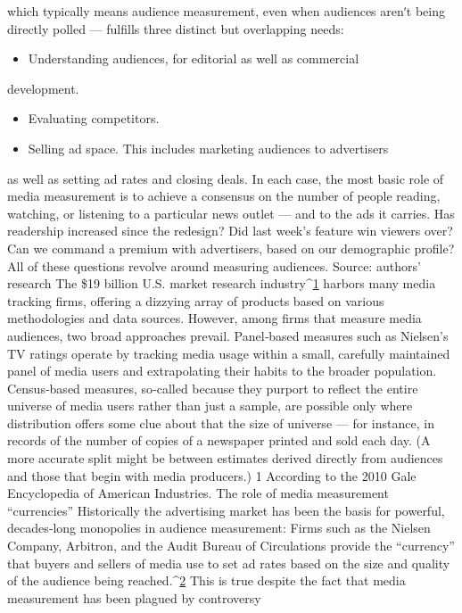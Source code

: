 which typically means audience measurement, even when audiences
arenʹt being directly polled — fulfills three distinct but overlapping needs:
\begin{itemize}
\item Understanding audiences, for editorial as well as commercial
\end{itemize}
development.
\begin{itemize}
\item Evaluating competitors.
\item Selling ad space. This includes marketing audiences to advertisers
\end{itemize}
as well as setting ad rates and closing deals.
In each case, the most basic role of media measurement is to achieve a
consensus on the number of people reading, watching, or listening to a
particular news outlet — and to the ads it carries. Has readership
increased since the redesign? Did last week’s feature win viewers over?
Can we command a premium with advertisers, based on our demographic
profile? All of these questions revolve around measuring audiences.
Source: authors’ research
The \$19 billion U.S. market research industry^{\href{#endnotes}{1}} harbors many media
tracking firms, offering a dizzying array of products based on various
methodologies and data sources. However, among firms that measure
media audiences, two broad approaches prevail. Panel‐based measures
such as Nielsen’s TV ratings operate by tracking media usage within a
small, carefully maintained panel of media users and extrapolating their
habits to the broader population. Census‐based measures, so‐called
because they purport to reflect the entire universe of media users rather
than just a sample, are possible only where distribution offers some clue
about that the size of universe — for instance, in records of the number of
copies of a newspaper printed and sold each day. (A more accurate split
might be between estimates derived directly from audiences and those
that begin with media producers.)
1 According to the 2010 Gale Encyclopedia of American Industries.
The role of media measurement ``currencies''
Historically the advertising market has been the basis for powerful,
decades‐long monopolies in audience measurement: Firms such as the
Nielsen Company, Arbitron, and the Audit Bureau of Circulations
provide the ``currency'' that buyers and sellers of media use to set ad rates
based on the size and quality of the audience being reached.^{\href{#endnotes}{2}} This is true
despite the fact that media measurement has been plagued by controversy
